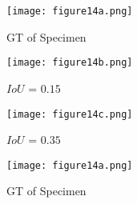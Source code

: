 \begin{figure} [!h]
	\centering
	\begin{subfigure}[b]{0.32\textwidth}
		\centering
		\DIFdelbeginFL %
\DIFdelendFL \DIFaddbeginFL \texttt{[image: figure14a.png]}
		\DIFaddendFL \caption{GT of Specimen~}
		\label{fig:gt_specimen_2}
	\end{subfigure}
	\hfill
	\begin{subfigure}[b]{0.32\textwidth}
		\centering
		\DIFdelbeginFL %
\DIFdelendFL \DIFaddbeginFL \texttt{[image: figure14b.png]}
		\DIFaddendFL \caption{\(IoU\) = \(0.15\)} 
		\label{fig:L3_S2_B_saeed}
	\end{subfigure}
	\hfill
	\begin{subfigure}[b]{0.32\textwidth}
		\centering
		\DIFdelbeginFL %
\DIFdelendFL \DIFaddbeginFL \texttt{[image: figure14c.png]}
		\DIFaddendFL \caption{\(IoU\) = \(0.35\)} 
		\label{fig:L3_S2_B_ijjeh}
	\end{subfigure}
	\par\medskip
	\begin{subfigure}[b]{0.32\textwidth}
		\centering
		\DIFdelbeginFL %
\DIFdelendFL \DIFaddbeginFL \texttt{[image: figure14a.png]}
		\DIFaddendFL \caption{GT of Specimen~}
		\label{fig:gt_specimen_3}
	\end{subfigure}
	\hfill
	\begin{subfigure}[b]{0.32\textwidth}

\end{subfigure}
\end{figure}
